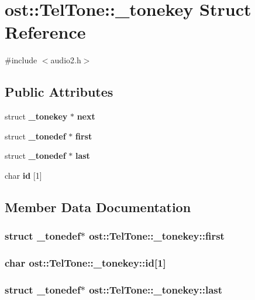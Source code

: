 \section{ost::TelTone::\_\-tonekey Struct Reference}
\label{structost_1_1_tel_tone_1_1__tonekey}


{\ttfamily \#include $<$audio2.h$>$}\subsection*{Public Attributes}
\begin{DoxyCompactItemize}
\item 
struct {\bf \_\-tonekey} $\ast$ {\bf next}
\item 
struct {\bf \_\-tonedef} $\ast$ {\bf first}
\item 
struct {\bf \_\-tonedef} $\ast$ {\bf last}
\item 
char {\bf id} [1]
\end{DoxyCompactItemize}


\subsection{Member Data Documentation}
\subsubsection[{first}]{\setlength{\rightskip}{0pt plus 5cm}struct {\bf \_\-tonedef}$\ast$ {\bf ost::TelTone::\_\-tonekey::first}\hspace{0.3cm}{\ttfamily  [read]}}\label{structost_1_1_tel_tone_1_1__tonekey_a5ee285737d2f8ca1acc643f5eef2221f}
\subsubsection[{id}]{\setlength{\rightskip}{0pt plus 5cm}char {\bf ost::TelTone::\_\-tonekey::id}[1]}\label{structost_1_1_tel_tone_1_1__tonekey_a61007a09f569ffcc5bda1afaa9714577}
\subsubsection[{last}]{\setlength{\rightskip}{0pt plus 5cm}struct {\bf \_\-tonedef}$\ast$ {\bf ost::TelTone::\_\-tonekey::last}\hspace{0.3cm}{\ttfamily  [read]}}\label{structost_1_1_tel_tone_1_1__tonekey_aa7ffcb8ee36bd9834cb05f5bc31952d2}
